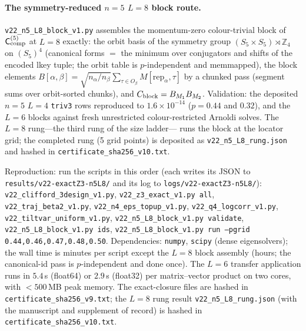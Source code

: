 \documentclass[aps,prx,reprint,superscriptaddress,nobibnotes,longbibliography]{revtex4-2}
\newcommand{\Ccomp}{\mathsf C_{\rm comp}}
\begin{document}
\paragraph{The symmetry-reduced $n=5$ $L=8$ block route.}
\texttt{v22\_n5\_L8\_block\_v1.py} assembles the momentum-zero
colour-trivial block of $\Ccomp^{(5)}$ at $L=8$ exactly: the orbit basis
of the symmetry group $(S_5\times S_5)\rtimes\mathbb Z_4$ on
$(S_5)^4$ (canonical forms $=$ the minimum over conjugators and shifts of
the encoded lkey tuple; the orbit table is $p$-independent and
memmapped), the block elements
$B[\alpha,\beta]=\sqrt{n_\alpha/n_\beta}\sum_{\tau\in O_\beta}
M[\mathrm{rep}_\alpha,\tau]$ by a chunked pass (segment sums over
orbit-sorted chunks), and $C_{\rm block}=B_{M_1}B_{M_2}$.  Validation:
the deposited $n=5$ $L=4$ \texttt{triv3} rows reproduced to
$1.6\times10^{-14}$ ($p=0.44$ and $0.32$), and the $L=6$ blocks against
fresh unrestricted colour-restricted Arnoldi solves.  The $L=8$ rung---the third rung of the size ladder---
runs the block at the locator grid; the completed rung (5 grid
points) is deposited as \texttt{v22\_n5\_L8\_rung.json} and hashed in
\texttt{certificate\_sha256\_v10.txt}.

Reproduction: run the scripts in this order (each writes its JSON to
\texttt{results/v22-exactZ3-n5L8/} and its log to
\texttt{logs/v22-exactZ3-n5L8/}): \texttt{v22\_clifford\_3design\_v1.py},
\texttt{v22\_z3\_exact\_v1.py all},
\texttt{v22\_traj\_beta2\_v1.py},
\texttt{v22\_n4\_eps\_topup\_v1.py},
\texttt{v22\_q4\_logcorr\_v1.py},
\texttt{v22\_tiltvar\_uniform\_v1.py},
\texttt{v22\_n5\_L8\_block\_v1.py validate},
\texttt{v22\_n5\_L8\_block\_v1.py ids},
\texttt{v22\_n5\_L8\_block\_v1.py run --pgrid 0.44,0.46,0.47,0.48,0.50}.
Dependencies: \texttt{numpy}, \texttt{scipy} (dense eigensolvers); the
wall time is minutes per script except the $L=8$ block assembly (hours;
the canonical-id pass is $p$-independent and done once).  The $L=6$
transfer application runs in $5.4$\,s (float64) or $2.9$\,s (float32)
per matrix--vector product on two cores, with $<500$\,MB peak memory.  The exact-closure files are hashed in
\texttt{certificate\_sha256\_v9.txt}; the $L=8$ rung result
\texttt{v22\_n5\_L8\_rung.json} (with the manuscript and supplement of
record) is hashed in \texttt{certificate\_sha256\_v10.txt}.
\end{document}
